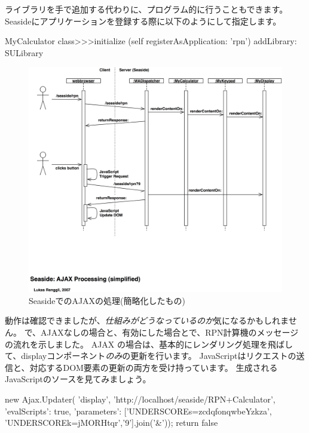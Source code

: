 \documentclass[a4paper,10pt,twoside]{book}
\begin{document}
ライブラリを手で追加する代わりに、プログラム的に行うこともできます。Seasideにアプリケーションを登録する際に以下のようにして指定します。
\begin{code}{}
MyCalculator class>>>initialize
	(self registerAsApplication: 'rpn')
		addLibrary: SULibrary
\end{code}

\begin{figure}[ht]
\begin{center}
\includegraphics[width=\textwidth]{ajax-processing}
\caption{SeasideでのAJAXの処理(簡略化したもの)}
\end{center}
\end{figure}


動作は確認できましたが、\emph{仕組みがどうなっているのか}気になるかもしれません。
で、AJAXなしの場合と、有効にした場合とで、RPN計算機のメッセージの流れを示しました。
AJAX の場合は、基本的にレンダリング処理を飛ばして、displayコンポーネント\emph{のみ}の更新を行います。
JavaScriptはリクエストの送信と、対応するDOM要素の更新の両方を受け持っています。
生成されるJavaScriptのソースを見てみましょう。

\begin{code}{}
new Ajax.Updater(
	'display',
	'http://localhost/seaside/RPN+Calculator',
	{'evalScripts': true,
	  'parameters': ['UNDERSCOREs=zcdqfonqwbeYzkza', 'UNDERSCOREk=jMORHtqr','9'].join('&')});
return false
\end{code}
\end{document}

